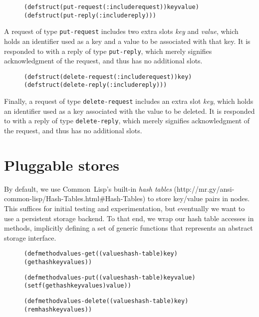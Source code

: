 \documentclass [a4paper,12pt,oneside]{article}\usepackage [paper=a4paper,left=37.5264mm,right=37.5264mm,top=37.5264mm,bottom=37.5264mm]{geometry}\usepackage {graphicx}\usepackage {tabularx}\usepackage {alltt}\usepackage {float}\usepackage [section]{placeins}\usepackage {titling}\setlength {\droptitle }{-4em}\pretitle {\begin {flushright}\bfseries \LARGE }\posttitle {\end {flushright}}\preauthor {\begin {flushright}}\postauthor {\end {flushright}}\predate {\begin {flushright}}\postdate {\end {flushright}}\usepackage [english]{babel}\usepackage [T1]{fontenc}\usepackage [utf8x]{inputenc}\usepackage {stmaryrd}\usepackage {amsfonts}\DeclareUnicodeCharacter {12314}{$\llbracket $}\DeclareUnicodeCharacter {12315}{$\rrbracket $}\DeclareUnicodeCharacter {9655}{$\rhd $}\newcommand \nobreakdash {\mbox {-}}\DeclareUnicodeCharacter {8209}{\nobreakdash }\usepackage [sc]{mathpazo}\linespread {1.05}\usepackage [font={small},labelformat=empty,labelsep=none]{caption}\tolerance=10000 \clubpenalty=10000 \widowpenalty=10000 \frenchspacing
\begin{document}
\begin {figure}[H]\centering \begin {alltt}
(defstruct (put-request (:include request)) key value)
(defstruct (put-reply (:include reply)))
\end{alltt}\vspace {-1em}\end {figure}

A request of type \texttt {put-request} includes two extra slots \textit {key} and \textit {value}, which holds an identifier used as a key and a value to be associated with that key. It is responded to with a reply of type \texttt {put-reply}, which merely signifies acknowledgment of the request, and thus has no additional slots.

\begin {figure}[H]\centering \begin {alltt}
(defstruct (delete-request (:include request)) key)
(defstruct (delete-reply (:include reply)))
\end{alltt}\vspace {-1em}\end {figure}

Finally, a request of type \texttt {delete-request} includes an extra slot \textit {key}, which holds an identifier used as a key associated with the value to be deleted. It is responded to with a reply of type \texttt {delete-reply}, which merely signifies acknowledgment of the request, and thus has no additional slots.



\section* {Pluggable stores}

By default, we use Common Lisp’s built-in \textit {hash tables} (\textsf {http:/\allowbreak /\allowbreak mr.gy/\allowbreak ansi-common-lisp/\allowbreak Hash-Tables.html\#\allowbreak Hash-Tables}) to store key/value pairs in nodes. This suffices for initial testing and experimentation, but eventually we want to use a persistent storage backend. To that end, we wrap our hash table accesses in methods, implicitly defining a set of generic functions that represents an abstract storage interface.

\begin {figure}[H]\centering \begin {alltt}
(defmethod values-get ((values hash-table) key)
  (gethash key values))

(defmethod values-put ((values hash-table) key value)
  (setf (gethash key values) value))

(defmethod values-delete ((values hash-table) key)
  (remhash key values))
\end{alltt}\vspace {-1em}\end {figure}
\end{document}
